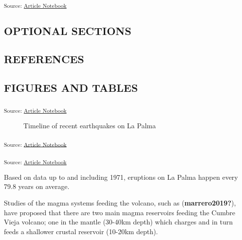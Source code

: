 \documentclass[
]{agujournal2019}
\begin{document}
\textsubscript{Source:
\href{https://rvcrawford.github.io/glowing-system/index.qmd.html}{Article
Notebook}}

\subsection{OPTIONAL SECTIONS}\label{optional-sections}

\subsection{REFERENCES}\label{references}

\subsection{FIGURES AND TABLES}\label{figures-and-tables}

\textsubscript{Source:
\href{https://rvcrawford.github.io/glowing-system/index.qmd.html}{Article
Notebook}}

\label{cell-fig-timeline}
\begin{figure}[H]


\caption{\label{fig-timeline}Timeline of recent earthquakes on La Palma}

\end{figure}%

\textsubscript{Source:
\href{https://rvcrawford.github.io/glowing-system/index.qmd.html}{Article
Notebook}}

\textsubscript{Source:
\href{https://rvcrawford.github.io/glowing-system/index.qmd.html}{Article
Notebook}}

Based on data up to and including 1971, eruptions on La Palma happen
every 79.8 years on average.

Studies of the magma systems feeding the volcano, such as
(\textbf{marrero2019?}), have proposed that there are two main magma
reservoirs feeding the Cumbre Vieja volcano; one in the mantle (30-40km
depth) which charges and in turn feeds a shallower crustal reservoir
(10-20km depth).
\end{document}
